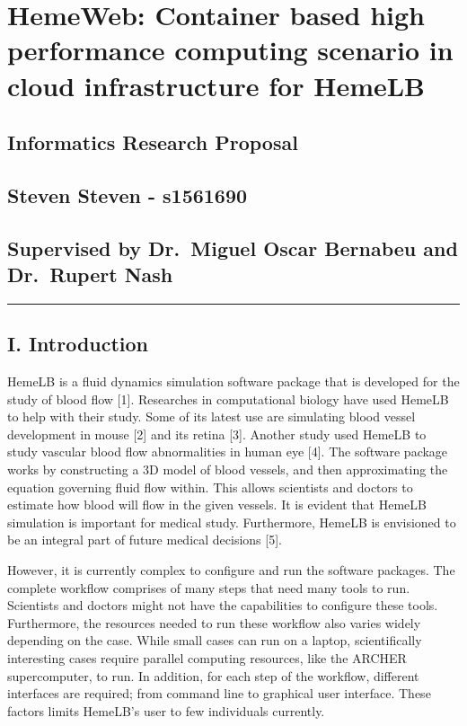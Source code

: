 \documentclass[]{article}
\date{}
\begin{document}
\section{HemeWeb: Container based high performance computing scenario in
cloud infrastructure for
HemeLB}\label{hemeweb-container-based-high-performance-computing-scenario-in-cloud-infrastructure-for-hemelb}

\subsection{Informatics Research
Proposal}\label{informatics-research-proposal}

\subsection{Steven Steven - s1561690}\label{steven-steven---s1561690}
\subsection{Supervised by Dr.~Miguel Oscar Bernabeu and Dr.~Rupert
Nash}\label{supervised-by-dr.miguel-oscar-bernabeu-and-dr.rupert-nash}

\begin{center}\rule{0.5\linewidth}{\linethickness}\end{center}

\subsection{I. Introduction}\label{i.-introduction}

HemeLB is a fluid dynamics simulation software package that is developed
for the study of blood flow {[}1{]}. Researches in computational biology
have used HemeLB to help with their study. Some of its latest use are
simulating blood vessel development in mouse {[}2{]} and its retina
{[}3{]}. Another study used HemeLB to study vascular blood flow
abnormalities in human eye {[}4{]}. The software package works by
constructing a 3D model of blood vessels, and then approximating the
equation governing fluid flow within. This allows scientists and doctors
to estimate how blood will flow in the given vessels. It is evident that
HemeLB simulation is important for medical study. Furthermore, HemeLB is
envisioned to be an integral part of future medical decisions {[}5{]}.

However, it is currently complex to configure and run the software
packages. The complete workflow comprises of many steps that need many
tools to run. Scientists and doctors might not have the capabilities to
configure these tools. Furthermore, the resources needed to run these
workflow also varies widely depending on the case. While small cases can
run on a laptop, scientifically interesting cases require parallel
computing resources, like the ARCHER supercomputer, to run. In addition,
for each step of the workflow, different interfaces are required; from
command line to graphical user interface. These factors limits HemeLB's
user to few individuals currently.
\end{document}
